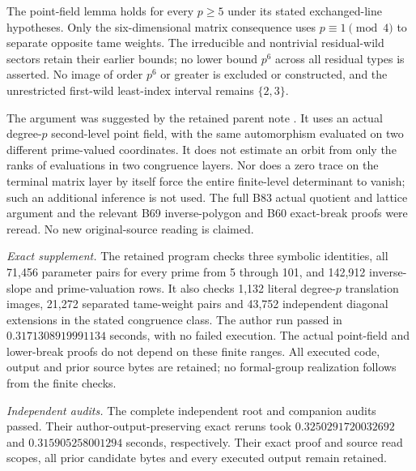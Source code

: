 \begin{remark}
\label{rem:B-RD85-scope}
The point-field lemma holds for every \(p\ge5\) under
its stated exchanged-line hypotheses. Only the
six-dimensional matrix consequence uses
\(p\equiv1\pmod4\) to separate opposite tame weights.
The irreducible and nontrivial residual-wild sectors
retain their earlier bounds; no lower bound \(p^6\)
across all residual types is asserted. No image of order
\(p^6\) or greater is excluded or constructed, and the
unrestricted first-wild least-index interval remains
\(\{2,3\}\).

The argument was suggested by the retained parent note
. It uses an
actual degree-\(p\) second-level point field, with the
same automorphism evaluated on two different prime-valued
coordinates. It does not estimate an orbit from only
the ranks of evaluations in two congruence layers.
Nor does a zero trace on the terminal matrix layer by
itself force the entire finite-level determinant to
vanish; such an additional inference is not used.
The full B83 actual quotient and lattice argument and
the relevant B69 inverse-polygon and B60 exact-break
proofs were reread. No new original-source reading is
claimed.

\smallskip
\noindent\emph{Exact supplement.}
The retained program
checks three symbolic identities, all 71,456 parameter
pairs for every prime from 5 through 101, and 142,912
inverse-slope and prime-valuation rows. It also checks
1,132 literal degree-\(p\) translation images,
21,272 separated tame-weight pairs and 43,752 independent
diagonal extensions in the stated congruence class.
The author run passed in \(0.3171308919991134\) seconds,
with no failed execution. The actual point-field and
lower-break proofs do not depend on these finite ranges.
All executed code, output and prior source bytes are
retained; no formal-group realization follows from
the finite checks.

\smallskip
\noindent\emph{Independent audits.}
The complete independent root and companion audits passed.
Their author-output-preserving exact reruns took
\(0.3250291720032692\) and
\(0.315905258001294\) seconds, respectively.
Their exact proof and source read scopes, all prior
candidate bytes and every executed output remain retained.
\end{remark}
